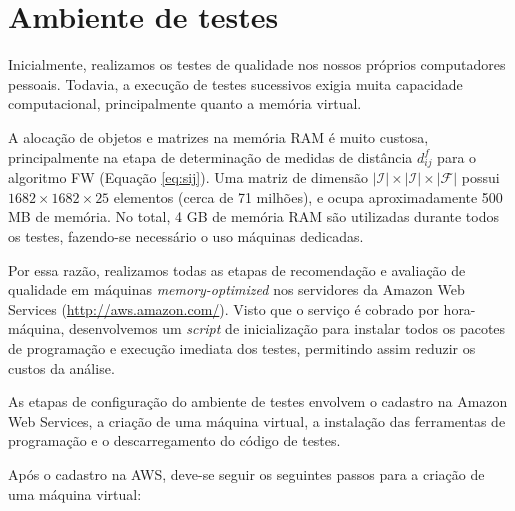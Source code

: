 

\section{Ambiente de testes} %
\label{sec:ambiente_de_testes}

Inicialmente, realizamos os testes de qualidade nos nossos próprios computadores pessoais. Todavia, a execução de testes sucessivos exigia muita capacidade computacional, principalmente quanto a memória virtual.

A alocação de objetos e matrizes na memória RAM é muito custosa, principalmente na etapa de determinação de medidas de distância $d_{ij}^f$ para o algoritmo FW (Equação \ref{eq:sij}). Uma matriz de dimensão $\left|\mathcal{I}\right| \times\left|\mathcal{I}\right| \times\left|\mathcal{F}\right|$ possui $1682 \times 1682 \times 25$ elementos (cerca de 71 milhões), e ocupa aproximadamente 500 MB de memória. No total, 4 GB de memória RAM são utilizadas durante todos os testes, fazendo-se necessário o uso máquinas dedicadas.

Por essa razão, realizamos todas as etapas de recomendação e avaliação de qualidade em máquinas \textit{memory-optimized} nos servidores da Amazon Web Services (\url{http://aws.amazon.com/}). Visto que o serviço é cobrado por hora-máquina, desenvolvemos um \textit{script} de inicialização para instalar todos os pacotes de programação e execução imediata dos testes, permitindo assim reduzir os custos da análise.   

As etapas de configuração do ambiente de testes envolvem o cadastro na Amazon Web Services, a criação de uma máquina virtual, a instalação das ferramentas de programação e o descarregamento do código de testes.

Após o cadastro na AWS, deve-se seguir os seguintes passos para a criação de uma máquina virtual:

